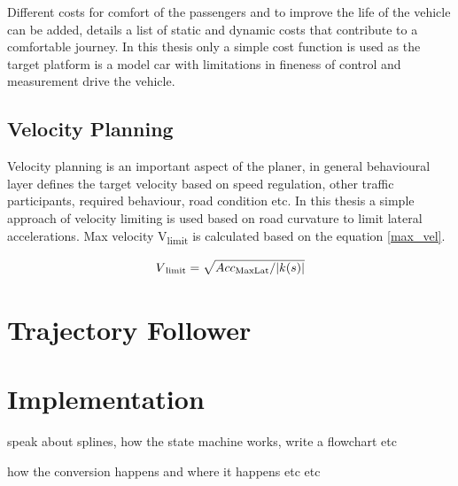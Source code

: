 Different costs for comfort of the passengers and to improve the life of the vehicle can be added, \cite{traj_planner_optimization} details a list of static and dynamic costs that contribute to a comfortable journey. In this thesis only a simple cost function is used as the target platform is a model car with limitations in fineness of control and measurement drive the vehicle. 

\subsection{Velocity Planning}
Velocity planning is an important aspect of the planer, in general behavioural layer defines the target velocity based on speed regulation, other traffic participants, required behaviour, road condition etc. In this thesis a simple approach of velocity limiting is used based on road curvature to limit lateral accelerations. Max velocity  V\textsubscript{limit} is calculated based on the equation \ref{max_vel}. 

\begin{equation}
    V\textsubscript{limit} = \sqrt{Acc\textsubscript{MaxLat} / |k(s)|}
\label{max_vel}
\end{equation}

\section{Trajectory Follower} \label{traj_follower}


\section{Implementation} \label{implementation}

speak about splines, how the state machine works, write a flowchart etc

how the conversion happens and where it happens etc etc
